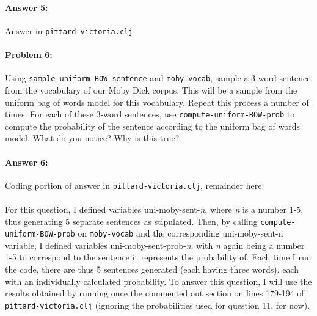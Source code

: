 \documentclass[10pt]{article}
\begin{document}
\paragraph{Answer 5:} Answer in
\texttt{pittard-victoria.clj}.

\hrulefill
\paragraph{Problem 6:}

Using \texttt{sample-uniform-BOW-sentence} and \texttt{moby-vocab},
sample a 3-word sentence from the vocabulary of our Moby Dick
corpus. This will be a sample from the uniform bag of words model for
this vocabulary. Repeat this process a number of times. For each of
these 3-word sentences, use \texttt{compute-uniform-BOW-prob} to
compute the probability of the sentence according to the uniform bag
of words model. What do you notice? Why is this true?

\paragraph{Answer 6:} Coding portion of answer in 
\texttt{pittard-victoria.clj}, remainder here:
\paragraph{} For this question, I defined variables uni-moby-sent-\textit{n}, where \textit{n} is a number 1-5, thus generating 5 separate sentences as stipulated. Then, by calling \texttt{compute-uniform-BOW-prob} on \texttt{moby-vocab} and the corresponding uni-moby-sent-n variable, I defined variables uni-moby-sent-prob-\textit{n}, with \textit{n} again being a number 1-5 to correspond to the sentence it represents the probability of. Each time I run the code, there are thus 5 sentences generated (each having three words), each with an individually calculated probability. To answer this question, I will use the results obtained by running once the commented out section on lines 179-194 of \texttt{pittard-victoria.clj} (ignoring the probabilities used for question 11, for now). 
\end{document}
